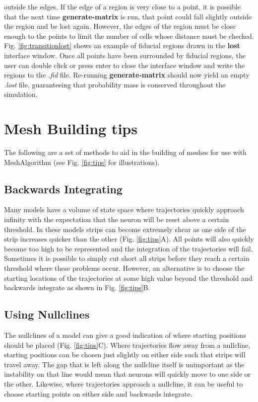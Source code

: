 \documentclass[utf8]{frontiers_suppmat} %
\begin{document}
outside the edges. If the edge of a region is very close to a point, it is possible that the next time \textbf{generate-matrix} is run, that point could fall slightly outside the region and be lost again. However, the edges of the region must be close enough to the points to limit the number of cells whose distance must be checked. Fig. \ref{fig:transitionlost} shows an example of fiducial regions drawn in the \textbf{lost} interface window. Once all points have been surrounded by fiducial regions, the user can double click or press enter to close the interface window and write the regions to the \textit{.fid} file. Re-running \textbf{generate-matrix} should now yield an empty \textit{.lost} file, guaranteeing that probability mass is conserved throughout the simulation.

\section{Mesh Building tips}
\label{meshtips}
The following are a set of methods to aid in the building of meshes for use with MeshAlgorithm (see Fig. \ref{fig:tips} for illustrations).\\
\subsection{Backwards Integrating}
Many models have a volume of state space where trajectories quickly approach infinity with the expectation that the neuron will be reset above a certain threshold. In these models strips can become extremely shear as one side of the strip increases quicker than the other (Fig. \ref{fig:tips}A). All points will also quickly become too high to be represented and the integration of the trajectories will fail. Sometimes it is possible to simply cut short all strips before they reach a certain threshold where these problems occur. However, an alternative is to choose the starting locations of the trajectories at some high value beyond the threshold and backwards integrate as shown in Fig. \ref{fig:tips}B.\\

\subsection{Using Nullclines}
The nullclines of a model can give a good indication of where starting positions should be placed (Fig. \ref{fig:tips}C). Where trajectories flow away from a nullcline, starting positions can be chosen just slightly on either side such that strips will travel away. The gap that is left along the nullcline itself is unimportant as the instability on that line would mean that neurons will quickly move to one side or the other. Likewise, where trajectories approach a nullcline, it can be useful to choose starting points on either side and backwards integrate.\\
\end{document}
